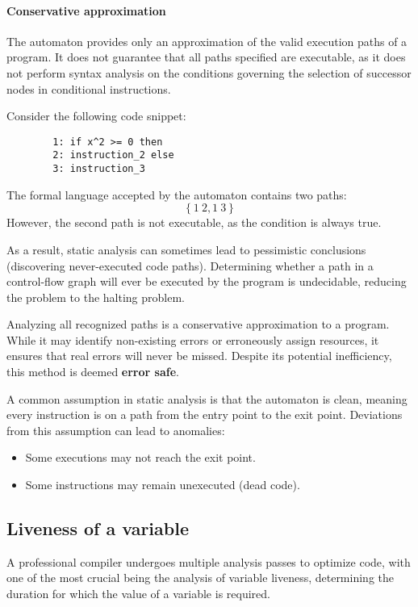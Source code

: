 \paragraph*{Conservative approximation}
The automaton provides only an approximation of the valid execution paths of a program. 
It does not guarantee that all paths specified are executable, as it does not perform syntax analysis on the conditions governing the selection of successor nodes in conditional instructions.
\begin{example}
    Consider the following code snippet: 
    \begin{verbatim}
        1: if x^2 >= 0 then
        2: instruction_2 else
        3: instruction_3
    \end{verbatim}
    The formal language accepted by the automaton contains two paths:
    \[ \left\{ 1 \: 2,  1 \: 3 \right\} \]
    However, the second path is not executable, as the condition is always true.
\end{example}
As a result, static analysis can sometimes lead to pessimistic conclusions (discovering never-executed code paths). 
Determining whether a path in a control-flow graph will ever be executed by the program is undecidable, reducing the problem to the halting problem.

Analyzing all recognized paths is a conservative approximation to a program. 
While it may identify non-existing errors or erroneously assign resources, it ensures that real errors will never be missed. 
Despite its potential inefficiency, this method is deemed \textbf{error safe}.

A common assumption in static analysis is that the automaton is clean, meaning every instruction is on a path from the entry point to the exit point. 
Deviations from this assumption can lead to anomalies:
\begin{itemize}
    \item Some executions may not reach the exit point.
    \item Some instructions may remain unexecuted (dead code).
\end{itemize}

\subsection{Liveness of a variable}
A professional compiler undergoes multiple analysis passes to optimize code, with one of the most crucial being the analysis of variable liveness, determining the duration for which the value of a variable is required.

